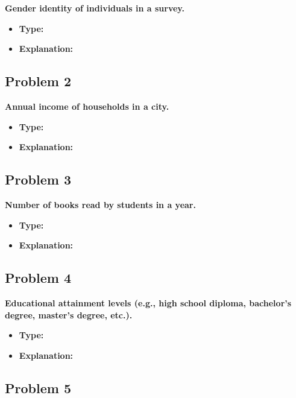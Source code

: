 \documentclass[
  letterpaper,
  DIV=11,
  numbers=noendperiod]{scrreprt}
\begin{document}
\textbf{Gender identity of individuals in a survey.}

\begin{itemize}
\item
  \textbf{Type:}
\item
  \textbf{Explanation:}
\end{itemize}

\subsection*{Problem 2}\label{problem-2}

\textbf{Annual income of households in a city.}

\begin{itemize}
\item
  \textbf{Type:}
\item
  \textbf{Explanation:}
\end{itemize}

\subsection*{Problem 3}\label{problem-3}

\textbf{Number of books read by students in a year.}

\begin{itemize}
\item
  \textbf{Type:}
\item
  \textbf{Explanation:}
\end{itemize}

\subsection*{Problem 4}\label{problem-4}

\textbf{Educational attainment levels (e.g., high school diploma,
bachelor's degree, master's degree, etc.).}

\begin{itemize}
\item
  \textbf{Type:}
\item
  \textbf{Explanation:}
\end{itemize}

\subsection*{Problem 5}\label{problem-5}
\end{document}
